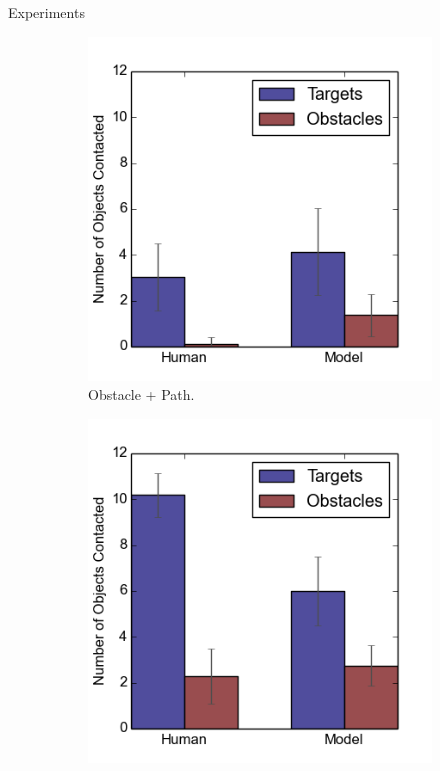 \documentclass[final]{beamer}
\begin{document}
\begin{frame}{}
\begin{textblock}{39}
\begin{block}{Experiments}
\begin{figure}[h]
\begin{subfigure}[b]{0.24\textwidth}
\includegraphics[width=\textwidth]{contact2.png}
\caption{Obstacle + Path.}
\end{subfigure}
\begin{subfigure}[b]{0.24\textwidth}
\includegraphics[width=\textwidth]{contact3.png}

\end{subfigure}
\end{figure}
\end{block}
\end{textblock}
\end{frame}
\end{document}
